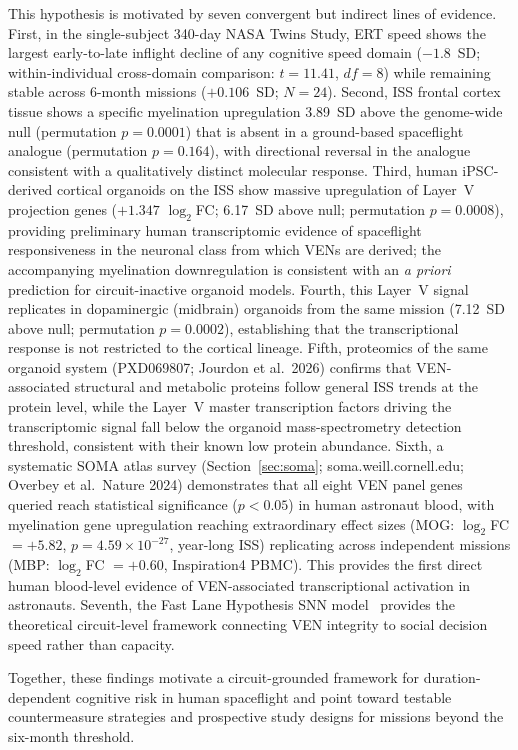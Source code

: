 \documentclass[11pt]{article}
\begin{document}
This hypothesis is motivated by seven convergent but indirect lines of
evidence.
First, in the single-subject 340-day NASA Twins Study, ERT speed shows
the largest early-to-late inflight decline of any cognitive speed domain
($-1.8$~SD; within-individual cross-domain comparison: $t=11.41$, $df=8$)
while remaining stable across 6-month missions ($+0.106$~SD; $N=24$).
Second, ISS frontal cortex tissue shows a specific myelination upregulation
3.89~SD above the genome-wide null (permutation $p=0.0001$) that is absent
in a ground-based spaceflight analogue (permutation $p=0.164$), with
directional reversal in the analogue consistent with a qualitatively
distinct molecular response.
Third, human iPSC-derived cortical organoids on the ISS show massive
upregulation of Layer~V projection genes ($+1.347$ $\log_2$FC; 6.17~SD
above null; permutation $p=0.0008$), providing preliminary human
transcriptomic evidence of spaceflight responsiveness in the neuronal class
from which VENs are derived; the accompanying myelination downregulation
is consistent with an \textit{a priori} prediction for circuit-inactive
organoid models.
Fourth, this Layer~V signal replicates in dopaminergic (midbrain)
organoids from the same mission (7.12~SD above null; permutation
$p=0.0002$), establishing that the transcriptional response is not
restricted to the cortical lineage.
Fifth, proteomics of the same organoid system (PXD069807; Jourdon et al.\
2026) confirms that VEN-associated structural and metabolic proteins
follow general ISS trends at the protein level, while the Layer~V
master transcription factors driving the transcriptomic signal fall
below the organoid mass-spectrometry detection threshold, consistent
with their known low protein abundance.
Sixth, a systematic SOMA atlas survey (Section~\ref{sec:soma};
soma.weill.cornell.edu; Overbey et al.\ Nature 2024) demonstrates that
all eight VEN panel genes queried reach statistical significance ($p < 0.05$)
in human astronaut blood, with myelination gene upregulation reaching
extraordinary effect sizes (MOG: $\log_2$FC $= +5.82$,
$p = 4.59 \times 10^{-27}$, year-long ISS) replicating across independent
missions (MBP: $\log_2$FC $= +0.60$, Inspiration4 PBMC).
This provides the first direct human blood-level evidence of VEN-associated
transcriptional activation in astronauts.
Seventh, the Fast Lane Hypothesis SNN model~\cite{keskin2026} provides
the theoretical circuit-level framework connecting VEN integrity to social
decision speed rather than capacity.

Together, these findings motivate a circuit-grounded framework for
duration-dependent cognitive risk in human spaceflight and point toward
testable countermeasure strategies and prospective study designs for
missions beyond the six-month threshold.
\end{document}
